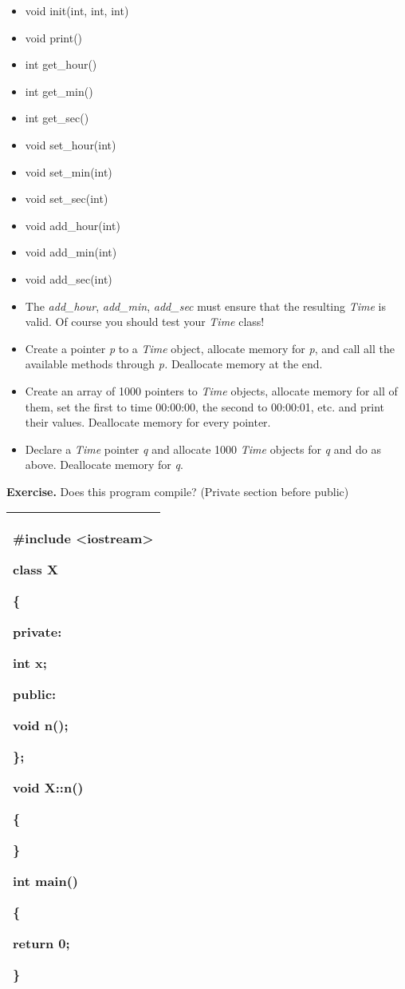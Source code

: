 \documentclass[
]{article}
\providecommand{\tightlist}{%
  \setlength{\itemsep}{0pt}\setlength{\parskip}{0pt}}
\begin{document}
\begin{itemize}
\tightlist
\item
  void init(int, int, int)
\item
  void print()
\item
  int get\_hour()
\item
  int get\_min()
\item
  int get\_sec()
\item
  void set\_hour(int)
\item
  void set\_min(int)
\item
  void set\_sec(int)
\item
  void add\_hour(int)
\item
  void add\_min(int)
\item
  void add\_sec(int)
\item
  The \emph{add\_hour}, \emph{add\_min}, \emph{add\_sec} must ensure
  that the resulting \emph{Time} is valid. Of course you should test
  your \emph{Time} class!
\item
  Create a pointer \emph{p} to a \emph{Time} object, allocate memory for
  \emph{p}, and call all the available methods through \emph{p.
  }Deallocate memory at the end.
\item
  Create an array of 1000 pointers to \emph{Time} objects, allocate
  memory for all of them, set the first to time 00:00:00, the second to
  00:00:01, etc. and print their values. Deallocate memory for every
  pointer.
\item
  Declare a \emph{Time} pointer \emph{q} and allocate 1000 \emph{Time}
  objects for \emph{q} and do as above. Deallocate memory for \emph{q}.
\end{itemize}

\textbf{Exercise.} Does this program compile? (Private section before
public)

\begin{longtable}[]{@{}l@{}}
\toprule
\endhead
\begin{minipage}[t]{0.97\columnwidth}\raggedright
\#include \textless iostream\textgreater{}

class X

\{

private:

int x;

public:

void n();

\};

void X::n()

\{

\}

int main()

\{

return 0;

\}\strut
\end{minipage}\tabularnewline
\bottomrule
\end{longtable}
\end{document}
